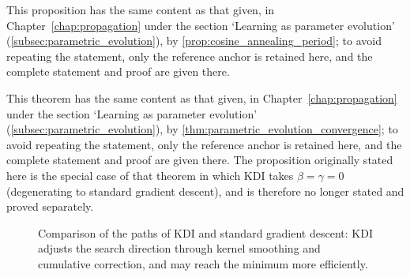 \begin{proposition}\label{prop:cosine_annealing_period_ps}
This proposition has the same content as that given, in Chapter~\ref{chap:propagation} under the section `Learning as parameter evolution' (\cref{subsec:parametric_evolution}), by \cref{prop:cosine_annealing_period}; to avoid repeating the statement, only the reference anchor is retained here, and the complete statement and proof are given there.
\end{proposition}

\begin{theorem}\label{thm:ps_kdi_convergence}
This theorem has the same content as that given, in Chapter~\ref{chap:propagation} under the section `Learning as parameter evolution' (\cref{subsec:parametric_evolution}), by \cref{thm:parametric_evolution_convergence}; to avoid repeating the statement, only the reference anchor is retained here, and the complete statement and proof are given there. The proposition originally stated here is the special case of that theorem in which KDI takes $\beta=\gamma=0$ (degenerating to standard gradient descent), and is therefore no longer stated and proved separately.
\end{theorem}

\begin{figure}[htbp]
\centering
{}
\caption{Comparison of the paths of KDI and standard gradient descent: KDI adjusts the search direction through kernel smoothing and cumulative correction, and may reach the minimum more efficiently.}
\label{fig:ps_kdi_path}
\end{figure}


